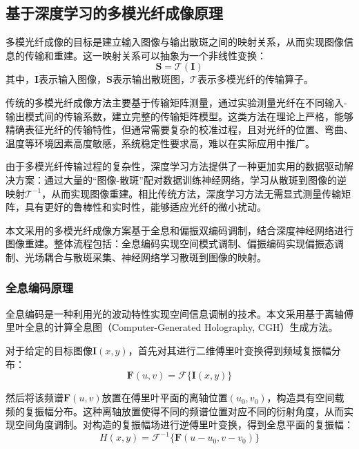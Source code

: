 {\subsection{基于深度学习的多模光纤成像原理}

多模光纤成像的目标是建立输入图像与输出散斑之间的映射关系，从而实现图像信息的传输和重建。这一映射关系可以抽象为一个非线性变换：
\begin{equation}
\mathbf{S} = \mathcal{T}(\mathbf{I})
\end{equation}
其中，$\mathbf{I}$表示输入图像，$\mathbf{S}$表示输出散斑图，$\mathcal{T}$表示多模光纤的传输算子。

传统的多模光纤成像方法主要基于传输矩阵测量\citep{popoff2010measuring, choi2012transmission}，通过实验测量光纤在不同输入-输出模式间的传输系数，建立完整的传输矩阵模型。这类方法在理论上严格，能够精确表征光纤的传输特性，但通常需要复杂的校准过程，且对光纤的位置、弯曲、温度等环境因素高度敏感，系统稳定性要求高，难以在实际应用中推广。

由于多模光纤传输过程的复杂性，深度学习方法提供了一种更加实用的数据驱动解决方案：通过大量的“图像-散斑”配对数据训练神经网络，学习从散斑到图像的逆映射$\mathcal{T}^{-1}$，从而实现图像重建。相比传统方法，深度学习方法无需显式测量传输矩阵，具有更好的鲁棒性和实时性，能够适应光纤的微小扰动。

本文采用的多模光纤成像方案基于全息和偏振双编码调制，结合深度神经网络进行图像重建。整体流程包括：全息编码实现空间模式调制、偏振编码实现偏振态调制、光场耦合与散斑采集、神经网络学习散斑到图像的映射。

\subsubsection{全息编码原理}

全息编码是一种利用光的波动特性实现空间信息调制的技术。本文采用基于离轴傅里叶全息\citep{leith1962reconstructed, leith1964wavefront}的计算全息图（Computer-Generated Holography, CGH）生成方法\citep{lohmann1967binary}。

对于给定的目标图像$\mathbf{I}(x,y)$，首先对其进行二维傅里叶变换得到频域复振幅分布：
\begin{equation}
\mathbf{F}(u,v) = \mathcal{F}\{\mathbf{I}(x,y)\}
\end{equation}

然后将该频谱$\mathbf{F}(u,v)$放置在傅里叶平面的离轴位置$(u_0, v_0)$，构造具有空间载频的复振幅分布。这种离轴放置使得不同的频谱位置对应不同的衍射角度，从而实现空间角度调制。对构造的复振幅场进行逆傅里叶变换，得到全息平面的复振幅：
\begin{equation}
H(x,y) = \mathcal{F}^{-1}\{\mathbf{F}(u-u_0, v-v_0)\}
\end{equation}

}
